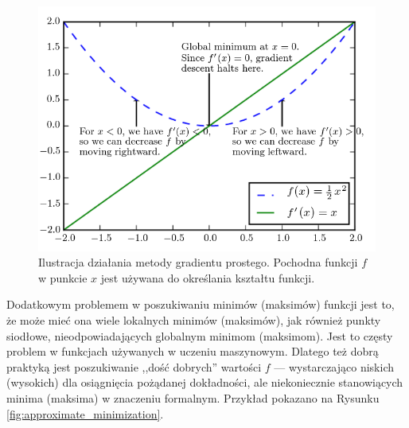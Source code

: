 \documentclass[12pt,a4paper,leqno,oneside,titlepage]{book}
\begin{document}
\begin{figure}[!tbp]
  \centering
  \begin{minipage}[b]{0.5\textheight}
    \includegraphics[width=\textwidth]{pictures/gradient_descent.png}
  \end{minipage}
  \caption{Ilustracja działania metody gradientu prostego. Pochodna funkcji $f$ w punkcie $x$ jest używana do określania kształtu funkcji.\cite{Goodfellow-et-al-2016}}
  \label{fig:gradient_descent}
\end{figure}

Dodatkowym problemem w poszukiwaniu minimów (maksimów) funkcji jest to, że może mieć ona wiele lokalnych minimów (maksimów), jak również punkty siodłowe, nieodpowiadających globalnym minimom (maksimom). Jest to częsty problem w funkcjach używanych w uczeniu maszynowym. Dlatego też dobrą praktyką jest poszukiwanie ,,dość dobrych'' wartości $f$ — wystarczająco niskich (wysokich) dla osiągnięcia pożądanej dokładności, ale niekoniecznie stanowiących minima (maksima) w znaczeniu formalnym. Przykład pokazano na Rysunku \ref{fig:approximate_minimization}.\cite{Goodfellow-et-al-2016}
\end{document}
